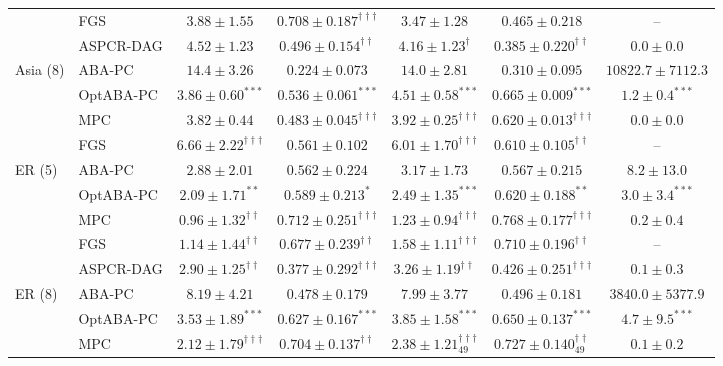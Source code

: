 \begin{table}[t]
\begin{tabular}{llccccc}
 & FGS & $3.88\pm1.55$ & $\mathbf{0.708\pm0.187}^{\dagger\dagger\dagger}$ & $3.47\pm1.28$ & $0.465\pm0.218$ & --\\
 & ASPCR-DAG & $4.52\pm1.23$ & $0.496\pm0.154^{\dagger\dagger}$ & $4.16\pm1.23^{\dagger}$ & $0.385\pm0.220^{\dagger\dagger}$ & $0.0\pm0.0$\\
\midrule
Asia (8) & ABA-PC & $14.4\pm3.26$ & $0.224\pm0.073$ & $14.0\pm2.81$ & $0.310\pm0.095$ & $10822.7\pm7112.3$\\
 & OptABA-PC & $\mathbf{3.86\pm0.60}^{***}$ & $\mathbf{0.536\pm0.061}^{***}$ & $\mathbf{4.51\pm0.58}^{***}$ & $\mathbf{0.665\pm0.009}^{***}$ & $\mathbf{1.2\pm0.4}^{***}$\\
 & MPC & $3.82\pm0.44$ & $0.483\pm0.045^{\dagger\dagger\dagger}$ & $\mathbf{3.92\pm0.25}^{\dagger\dagger\dagger}$ & $0.620\pm0.013^{\dagger\dagger\dagger}$ & $0.0\pm0.0$\\
 & FGS & $6.66\pm2.22^{\dagger\dagger\dagger}$ & $0.561\pm0.102$ & $6.01\pm1.70^{\dagger\dagger\dagger}$ & $0.610\pm0.105^{\dagger\dagger}$ & --\\
\midrule
ER (5) & ABA-PC & $2.88\pm2.01$ & $0.562\pm0.224$ & $3.17\pm1.73$ & $0.567\pm0.215$ & $8.2\pm13.0$\\
 & OptABA-PC & $\mathbf{2.09\pm1.71}^{**}$ & $\mathbf{0.589\pm0.213}^{*}$ & $\mathbf{2.49\pm1.35}^{***}$ & $\mathbf{0.620\pm0.188}^{**}$ & $\mathbf{3.0\pm3.4}^{***}$\\
 & MPC & $\mathbf{0.96\pm1.32}^{\dagger\dagger}$ & $\mathbf{0.712\pm0.251}^{\dagger\dagger\dagger}$ & $\mathbf{1.23\pm0.94}^{\dagger\dagger\dagger}$ & $\mathbf{0.768\pm0.177}^{\dagger\dagger\dagger}$ & $0.2\pm0.4$\\
 & FGS & $\mathbf{1.14\pm1.44}^{\dagger\dagger}$ & $\mathbf{0.677\pm0.239}^{\dagger\dagger}$ & $\mathbf{1.58\pm1.11}^{\dagger\dagger\dagger}$ & $\mathbf{0.710\pm0.196}^{\dagger\dagger}$ & --\\
 & ASPCR-DAG & $2.90\pm1.25^{\dagger\dagger}$ & $0.377\pm0.292^{\dagger\dagger\dagger}$ & $3.26\pm1.19^{\dagger\dagger}$ & $0.426\pm0.251^{\dagger\dagger\dagger}$ & $0.1\pm0.3$\\
\midrule
ER (8) & ABA-PC & $8.19\pm4.21$ & $0.478\pm0.179$ & $7.99\pm3.77$ & $0.496\pm0.181$ & $3840.0\pm5377.9$\\
 & OptABA-PC & $\mathbf{3.53\pm1.89}^{***}$ & $\mathbf{0.627\pm0.167}^{***}$ & $\mathbf{3.85\pm1.58}^{***}$ & $\mathbf{0.650\pm0.137}^{***}$ & $\mathbf{4.7\pm9.5}^{***}$\\
 & MPC & $\mathbf{2.12\pm1.79}^{\dagger\dagger\dagger}$ & $\mathbf{0.704\pm0.137}^{\dagger\dagger}$ & $\mathbf{2.38\pm1.21}^{\dagger\dagger\dagger}_{49}$ & $\mathbf{0.727\pm0.140}^{\dagger\dagger}_{49}$ & $0.1\pm0.2$\\

\end{tabular}
\end{table}
